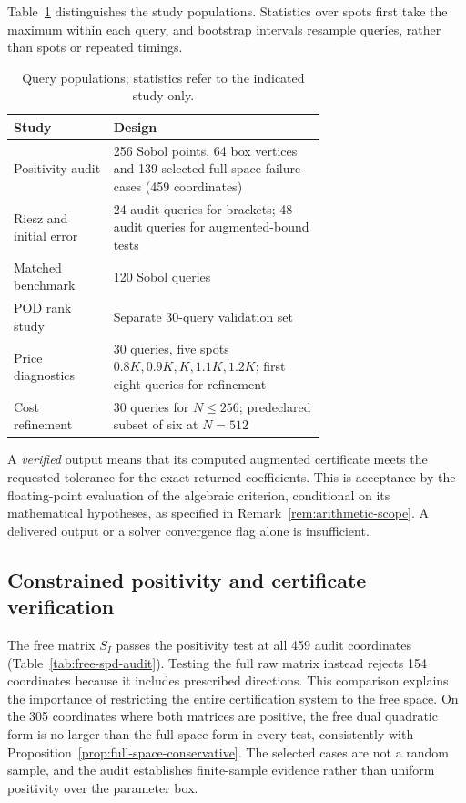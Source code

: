 \documentclass[11pt]{amsart}
\theoremstyle{remark}
\begin{document}
Table~\ref{tab:populations} distinguishes the study populations.
Statistics over spots first take the maximum within each query, and
bootstrap intervals resample queries, rather than spots or repeated timings.
\begin{table}[ht]
\centering\small
\caption{Query populations; statistics refer to the indicated study only.}
\label{tab:populations}
\begin{tabular}{lp{0.68\linewidth}}
\toprule
Study & Design\\
\midrule
Positivity audit & 256 Sobol points, 64 box vertices and 139 selected
full-space failure cases (459 coordinates)\\
Riesz and initial error & 24 audit queries for brackets; 48 audit queries
for augmented-bound tests\\
Matched benchmark & 120 Sobol queries\\
POD rank study & Separate 30-query validation set\\
Price diagnostics & 30 queries, five spots $0.8K,0.9K,K,1.1K,1.2K$;
first eight queries for refinement\\
Cost refinement & 30 queries for $N\le256$; predeclared subset of six at $N=512$\\
\bottomrule
\end{tabular}
\end{table}
A \emph{verified} output means that its computed augmented certificate meets
the requested tolerance for the exact returned coefficients. This is
acceptance by the floating-point evaluation of the algebraic criterion,
conditional on its mathematical hypotheses, as specified in
Remark~\ref{rem:arithmetic-scope}. A delivered output or a solver convergence
flag alone is insufficient.

\subsection{Constrained positivity and certificate verification}
\label{ssec:audit-results}\label{ssec:bracket-results}
The free matrix $S_I$ passes the positivity test at all 459 audit
coordinates (Table~\ref{tab:free-spd-audit}). Testing the full raw matrix
instead rejects 154 coordinates because it includes prescribed directions.
This comparison explains the importance of restricting the entire
certification system to the free space. On the 305 coordinates where both
matrices are positive, the free dual quadratic form is no larger than the
full-space form in every test, consistently with
Proposition~\ref{prop:full-space-conservative}. The selected cases are not a
random sample, and the audit establishes finite-sample evidence rather than
uniform positivity over the parameter box.
\end{document}
